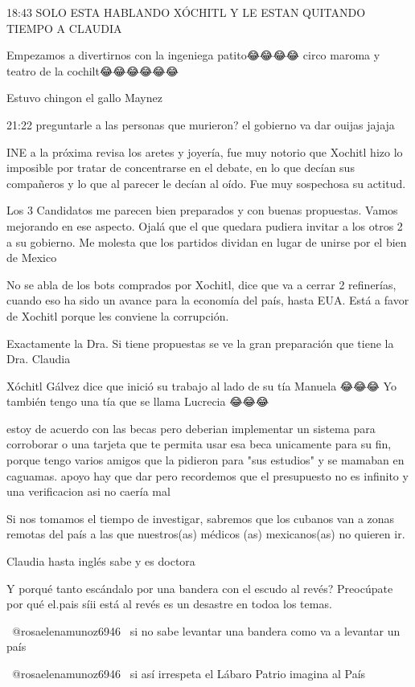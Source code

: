 18:43 SOLO ESTA HABLANDO XÓCHITL Y LE ESTAN QUITANDO TIEMPO A CLAUDIA

Empezamos a divertirnos con la ingeniega patito😂😂😂😂 circo maroma y teatro de la cochilt😂😂😂😂😂😂

Estuvo chingon el gallo Maynez

21:22 preguntarle a las personas que murieron?  el gobierno va dar ouijas jajaja

INE a la próxima revisa los aretes y joyería, fue muy notorio que Xochitl hizo lo imposible por tratar de concentrarse en el debate, en lo que decían sus compañeros y lo que al parecer le decían al oído. 
Fue muy sospechosa su actitud.

Los 3 Candidatos me parecen bien preparados y con buenas propuestas. Vamos mejorando en ese aspecto. Ojalá que el que quedara pudiera invitar a los otros 2 a su gobierno. Me molesta que los partidos dividan en lugar de unirse por el bien de Mexico

No se abla de los bots comprados por Xochitl, dice que va a cerrar 2 refinerías, cuando eso ha sido un avance para la economía del país, hasta EUA. Está a favor de Xochitl porque les conviene la corrupción.

Exactamente la Dra. Si tiene propuestas se ve la gran preparación que tiene la Dra. Claudia

Xóchitl Gálvez dice que inició su trabajo al lado de su tía Manuela 😂😂😂 Yo también tengo una tía que se llama Lucrecia 😂😂😂

estoy de acuerdo con las becas pero deberian implementar un sistema para corroborar o una tarjeta que te permita usar esa beca unicamente para su fin, porque tengo varios amigos que la pidieron para "sus estudios" y se mamaban en caguamas. apoyo hay que dar pero recordemos que el presupuesto no es infinito y una verificacion asi no caería mal

Si nos tomamos el tiempo de investigar, sabremos que los cubanos van a zonas remotas del país a las que nuestros(as) médicos (as) mexicanos(as) no quieren ir.

​Claudia hasta inglés sabe y es doctora

Y porqué tanto escándalo por una bandera con el escudo al revés? Preocúpate por qué el.pais síii está al revés es un desastre en todoa los temas.

​ @rosaelenamunoz6946  si no sabe levantar una bandera como va a levantar un país

 @rosaelenamunoz6946  si así irrespeta el Lábaro Patrio imagina al País

